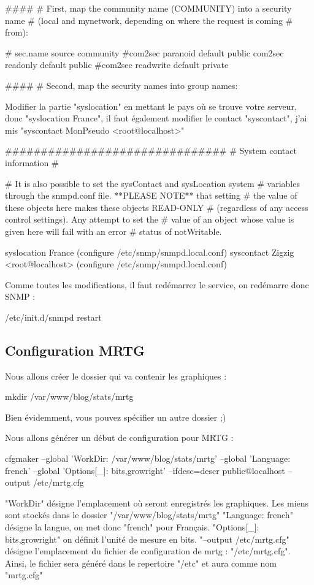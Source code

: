 ####
# First, map the community name (COMMUNITY) into a security name
# (local and mynetwork, depending on where the request is coming
# from):

# sec.name source community
#com2sec paranoid default public
com2sec readonly default public
#com2sec readwrite default private

####
# Second, map the security names into group names:


Modifier la partie "syslocation" en mettant le pays où se trouve votre serveur, donc "syslocation France", il faut également modifier le contact "syscontact", j'ai mis "syscontact MonPseudo <root@localhost>"

###############################
# System contact information
#

# It is also possible to set the sysContact and sysLocation system
# variables through the snmpd.conf file. **PLEASE NOTE** that setting
# the value of these objects here makes these objects READ-ONLY
# (regardless of any access control settings). Any attempt to set the
# value of an object whose value is given here will fail with an error
# status of notWritable.

syslocation France (configure /etc/snmp/snmpd.local.conf)
syscontact Zigzig <root@localhost> (configure /etc/snmp/snmpd.local.conf)


Comme toutes les modifications, il faut redémarrer le service, on redémarre donc SNMP :

/etc/init.d/snmpd restart


\subsection{Configuration MRTG}

Nous allons créer le dossier qui va contenir les graphiques :

mkdir /var/www/blog/stats/mrtg


Bien évidemment, vous pouvez spécifier un autre dossier ;)

Nous allons générer un début de configuration pour MRTG :

cfgmaker 
--global 'WorkDir: /var/www/blog/stats/mrtg' 
--global 'Language: french' 
--global 'Options[_]: bits,growright' 
--ifdesc=descr public@localhost 
--output /etc/mrtg.cfg


"WorkDir" désigne l'emplacement où seront enregistrés les graphiques. Les miens sont stockés dans le dossier "/var/www/blog/stats/mrtg"
"Language: french" désigne la langue, on met donc "french" pour Français.
"Options[_]: bits,growright" on définit l'unité de mesure en bits.
"--output /etc/mrtg.cfg" désigne l'emplacement du fichier de configuration de mrtg : "/etc/mrtg.cfg". Ainsi, le fichier sera généré dans le repertoire "/etc" et aura comme nom "mrtg.cfg"


